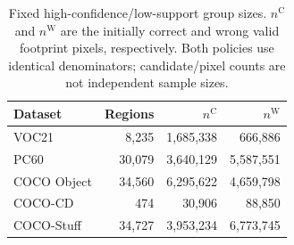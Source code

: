 \begin{table}[t]
\caption{Fixed high-confidence/low-support group sizes. $n^{\mathrm C}$ and $n^{\mathrm W}$ are the initially correct and wrong valid footprint pixels, respectively. Both policies use identical denominators; candidate/pixel counts are not independent sample sizes.}
\label{tab:risk-group-counts}
\centering\small
\begin{tabular}{@{}lrrr@{}}
\toprule
Dataset & Regions & $n^{\mathrm C}$ & $n^{\mathrm W}$ \\
\midrule
VOC21 & 8,235 & 1,685,338 & 666,886 \\
PC60 & 30,079 & 3,640,129 & 5,587,551 \\
COCO Object & 34,560 & 6,295,622 & 4,659,798 \\
COCO-CD & 474 & 30,906 & 88,850 \\
COCO-Stuff & 34,727 & 3,953,234 & 6,773,745 \\
\bottomrule
\end{tabular}
\end{table}
